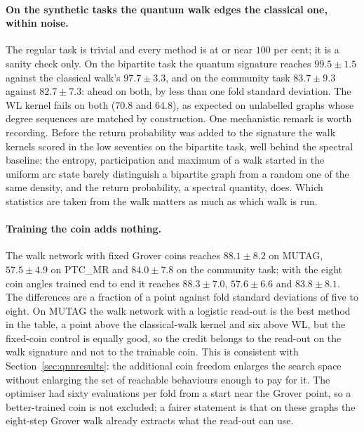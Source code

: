 \paragraph*{On the synthetic tasks the quantum walk edges the classical one,
within noise.}
The regular task is trivial and every method is at or near $100$ per cent; it
is a sanity check only. On the bipartite task the quantum signature reaches
$99.5 \pm 1.5$ against the classical walk's $97.7 \pm 3.3$, and on the
community task $83.7 \pm 9.3$ against $82.7 \pm 7.3$: ahead on both, by less
than one fold standard deviation. The WL kernel fails on both ($70.8$ and
$64.8$), as expected on unlabelled graphs whose degree sequences are matched
by construction. One mechanistic remark is worth recording. Before the return
probability was added to the signature the walk kernels scored in the low
seventies on the bipartite task, well behind the spectral baseline; the
entropy, participation and maximum of a walk started in the uniform arc state
barely distinguish a bipartite graph from a random one of the same density,
and the return probability, a spectral quantity, does. Which statistics are
taken from the walk matters as much as which walk is run.

\paragraph*{Training the coin adds nothing.}
The walk network with fixed Grover coins reaches $88.1 \pm 8.2$ on MUTAG,
$57.5 \pm 4.9$ on PTC\_MR and $84.0 \pm 7.8$ on the community task; with the
eight coin angles trained end to end it reaches $88.3 \pm 7.0$, $57.6 \pm
6.6$ and $83.8 \pm 8.1$. The differences are a fraction of a point against
fold standard deviations of five to eight. On MUTAG the walk network with a
logistic read-out is the best method in the table, a point above the
classical-walk kernel and six above WL, but the fixed-coin control is equally
good, so the credit belongs to the read-out on the walk signature and not to
the trainable coin. This is consistent with Section~\ref{sec:qnnresults}: the
additional coin freedom enlarges the search space without enlarging the set of
reachable behaviours enough to pay for it. The optimiser had sixty
evaluations per fold from a start near the Grover point, so a better-trained
coin is not excluded; a fairer statement is that on these graphs the
eight-step Grover walk already extracts what the read-out can use.

